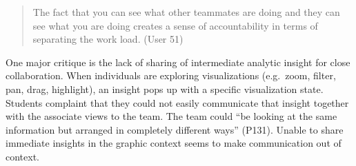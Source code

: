 \begin{quote}
	The fact that you can see what other teammates are doing and they can
	see what you are doing creates a sense of accountability in terms of
	separating the work load. (User 51)
\end{quote}

One major critique is the lack of sharing of intermediate analytic
insight for close collaboration. When individuals are exploring
visualizations (e.g.~zoom, filter, pan, drag, highlight), an insight
pops up with a specific visualization state. Students complaint that
they could not easily communicate that insight together with the
associate views to the team. The team could ``be looking at the same
information but arranged in completely different ways'' (P131). Unable
to share immediate insights in the graphic context seems to make
communication out of context.